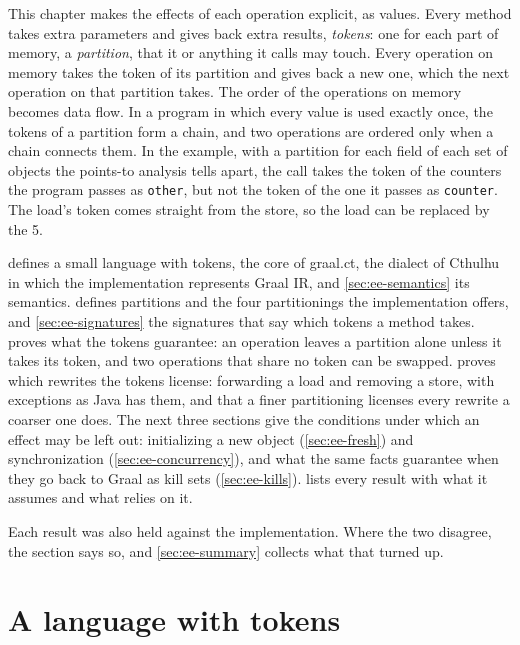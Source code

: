 This chapter makes the effects of each operation explicit, as values. Every
method takes extra parameters and gives back extra results, \emph{tokens}: one
for each part of memory, a \emph{partition}, that it or anything it calls may
touch. Every operation on memory takes the token of its partition and gives
back a new one, which the next operation on that partition takes. The order of
the operations on memory becomes data flow. In a program in which every value is
used exactly once, the tokens of a partition form a chain, and two operations
are ordered only when a chain connects them. In the example, with a partition
for each field of each set of objects the points-to analysis tells apart, the
call takes the token of the counters the program passes as \texttt{other}, but
not the token of the one it passes as \texttt{counter}. The load's token comes
straight from the store, so the load can be replaced by the 5.

 defines a small language with tokens, the core of
graal.ct, the dialect of Cthulhu in which the implementation represents Graal
IR, and \cref{sec:ee-semantics} its semantics. 
defines partitions and the four partitionings the implementation offers, and
\cref{sec:ee-signatures} the signatures that say which tokens a method takes.
 proves what the tokens guarantee: an operation leaves
a partition alone unless it takes its token, and two operations that share no
token can be swapped.  proves which rewrites the tokens
license: forwarding a load and removing a store, with exceptions as Java has
them, and that a finer partitioning licenses every rewrite a coarser one does. The next three sections give the conditions
under which an effect may be left out: initializing a new object
(\cref{sec:ee-fresh}) and synchronization (\cref{sec:ee-concurrency}), and what
the same facts guarantee when they go back to Graal as kill sets
(\cref{sec:ee-kills}).  lists every result with what it
assumes and what relies on it.

Each result was also held against the implementation. Where the two disagree,
the section says so, and \cref{sec:ee-summary} collects what that turned up.

\section{A language with tokens}\label{sec:ee-language}


